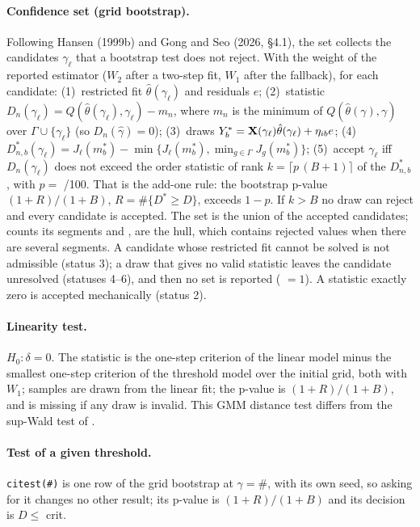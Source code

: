 \paragraph{Confidence set (grid bootstrap).} Following Hansen (1999b) and Gong and Seo (2026, \S4.1), the
set collects the candidates $\gamma_\ell$ that a bootstrap test does not reject. With the weight of
the reported estimator ($W_2$ after a two-step fit, $W_1$ after the fallback), for each candidate:
(1)~restricted fit $\hat\theta(\gamma_\ell)$ and residuals $e$; (2)~statistic
$D_n(\gamma_\ell)=Q(\hat\theta(\gamma_\ell),\gamma_\ell)-m_n$, where $m_n$ is the minimum of
$Q(\hat\theta(\gamma),\gamma)$ over $\Gamma\cup\{\gamma_\ell\}$ (so $D_n(\hat\gamma)=0$);
(3)~draws $Y^*_b=\mathbf{X}(\gamma_\ell)\hat\theta(\gamma_\ell)+\eta_{ib}e$; (4)~$D^*_{n,b}(\gamma_\ell)=J_\ell(m^*_b)-\min\{J_\ell(m^*_b),\min_{g\in\Gamma}J_g(m^*_b)\}$;
(5)~accept $\gamma_\ell$ iff $D_n(\gamma_\ell)$ does not exceed the order statistic of rank
$k=\lceil p\,(B+1)\rceil$ of the $D^*_{n,b}$, with $p=$ /100. That is the add-one rule:
the bootstrap p-value $(1+R)/(1+B)$, $R=\#\{D^*\ge D\}$, exceeds $1-p$. If $k>B$ no draw can reject and
every candidate is accepted. The set is the union of the accepted candidates; 
counts its segments and ,  are the hull, which contains rejected
values when there are several segments. A candidate whose restricted fit cannot be solved is not
admissible (status 3); a draw that gives no valid statistic leaves the candidate unresolved
(statuses 4--6), and then no set is reported ( $=1$). A statistic exactly zero
is accepted mechanically (status 2).

\paragraph{Linearity test.} $H_0:\delta=0$. The statistic is the one-step criterion of the linear model
minus the smallest one-step criterion of the threshold model over the initial grid, both with $W_1$;
samples are drawn from the linear fit; the p-value is $(1+R)/(1+B)$, and is missing if any draw is invalid.
This GMM distance test differs from the sup-Wald test of .

\paragraph{Test of a given threshold.} \texttt{citest(\#)} is one row of the grid bootstrap at $\gamma=\#$,
with its own seed, so asking for it changes no other result; its p-value is $(1+R)/(1+B)$ and its
decision is $D\le$ crit.

